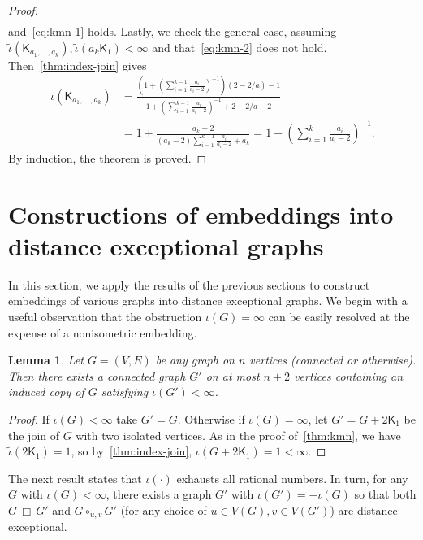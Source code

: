 \documentclass[11pt,a4paper]{article}
\newcommand{\Complete}{\mathsf{K}}
\newtheorem{lemma}[theorem]{Lemma}
\newcommand{\Circ}{\circ}
\begin{document}
\begin{proof}
\begin{align*}
            \end{align*}
        and~\cref{eq:kmn-1} holds. Lastly, we check the general case, assuming $\widetilde{\iota}(\Complete_{a_1,\dotsc, a_k}), \widetilde{\iota}(a_k\Complete_1) < \infty$ and that~\cref{eq:kmn-2} does not hold. Then~\cref{thm:index-join} gives
            \begin{align*}
                \iota(\Complete_{a_1,\ldots,a_k}) &= \frac{\left(1 + \left(\sum_{i=1}^{k-1} \frac{a_i}{a_i - 2}\right)^{-1}\right)(2 - 2/a) -1}{1 + \left(\sum_{i=1}^{k-1} \frac{a_i}{a_i - 2}\right)^{-1} +2 - 2/a - 2} \\
                &=1 + \frac{a_k - 2}{(a_k - 2){\sum_{i=1}^{k-1} \frac{a_i}{a_i - 2}} + a_k} = 1 + \left(\sum_{i=1}^k \frac{a_i}{a_i - 2}\right)^{-1}.
            \end{align*}
        By induction, the theorem is proved.
    \end{proof}

    \section{Constructions of embeddings into distance exceptional graphs}\label{sec:embeddings}

    In this section, we apply the results of the previous sections to construct embeddings of various graphs into distance exceptional graphs. We begin with a useful observation that the obstruction $\iota(G) = \infty$ can be easily resolved at the expense of a nonisometric embedding.

    \begin{lemma}\label{lem:infinite-obstruction}
        Let $G=(V,E)$ be any graph on $n$ vertices (connected or otherwise). Then there exists a connected graph $G'$ on at most $n+2$ vertices containing an induced copy of $G$ satisfying $\iota(G') < \infty$. 
    \end{lemma}

    \begin{proof}
        If $\iota(G) < \infty$ take $G'=G$. Otherwise if $\iota(G) = \infty$, let $G' = G + 2\Complete_1$ be the join of $G$ with two isolated vertices. As in the proof of~\cref{thm:kmn}, we have $\widetilde{\iota}(2\Complete_1) = 1$, so by~\cref{thm:index-join}, $\iota(G + 2\Complete_1) = 1 < \infty$.
    \end{proof}

    The next result states that $\iota(\cdot)$ exhausts all rational numbers. In turn, for any $G$ with $\iota(G) < \infty$, there exists a graph $G'$ with $\iota(G') = -\iota(G)$ so that both $G\,\Box\,G'$ and $G\Circ_{u, v} G'$ (for any choice of $u\in V(G), v\in V(G')$) are distance exceptional.
\end{document}
